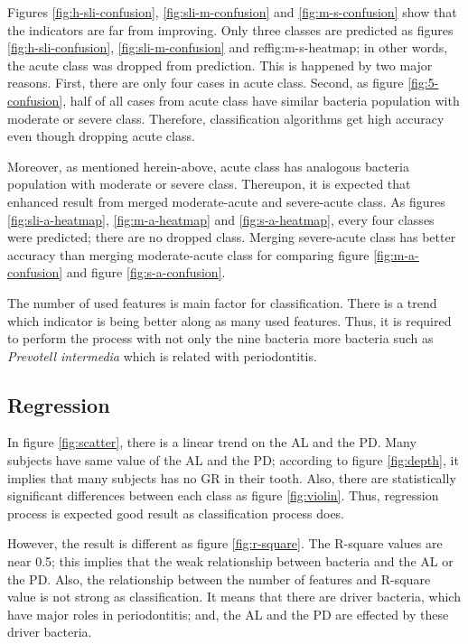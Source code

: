 \documentclass[11pt, a4paper]{article}
\begin{document}
			Figures \ref{fig:h-sli-confusion}, \ref{fig:sli-m-confusion} and \ref{fig:m-s-confusion} show that the indicators are far from improving. Only three classes are predicted as figures \ref{fig:h-sli-confusion}, \ref{fig:sli-m-confusion} and ref{fig:m-s-heatmap}; in other words, the acute class was dropped from prediction. This is happened by two major reasons. First, there are only four cases in acute class. Second, as figure \ref{fig:5-confusion}, half of all cases from acute class have similar bacteria population with moderate or severe class. Therefore, classification algorithms get high accuracy even though dropping acute class.
			
			Moreover, as mentioned herein-above, acute class has analogous bacteria population with moderate or severe class. Thereupon, it is expected that enhanced result from merged moderate-acute and severe-acute class. As figures \ref{fig:sli-a-heatmap}, \ref{fig:m-a-heatmap} and \ref{fig:s-a-heatmap}, every four classes were predicted; there are no dropped class. Merging severe-acute class has better accuracy than merging moderate-acute class for comparing figure \ref{fig:m-a-confusion} and figure \ref{fig:s-a-confusion}. 
			
			The number of used features is main factor for classification. There is a trend which indicator is being better along as many used features. Thus, it is required to perform the process with not only the nine bacteria more bacteria such as \textit{Prevotell intermedia} \cite{ref:pi1} which is related with periodontitis.
    	
    	\subsection{Regression}
    		In figure \ref{fig:scatter}, there is a linear trend on the AL and the PD. Many subjects have same value of the AL and the PD; according to figure \ref{fig:depth}, it implies that many subjects has no GR in their tooth. Also, there are statistically significant differences between each class as figure \ref{fig:violin}. Thus, regression process is expected good result as classification process does.
    		
    		However, the result is different as figure \ref{fig:r-square}. The R-square values are near 0.5; this implies that the weak relationship between bacteria and the AL or the PD. Also, the relationship between the number of features and R-square value is not strong as classification. It means that there are driver bacteria, which have major roles in periodontitis; and, the AL and the PD are effected by these driver bacteria. 
    		
\end{document}
